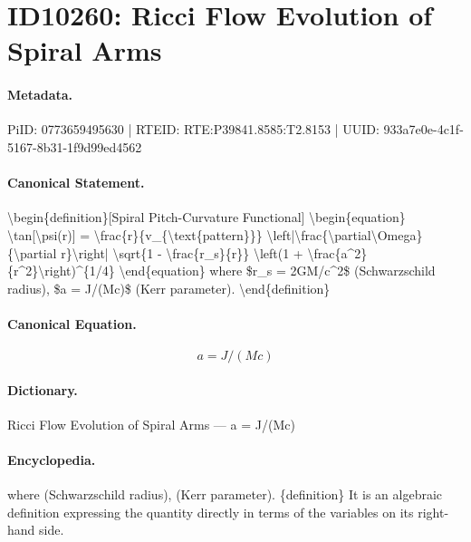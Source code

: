 \section*{ID10260: Ricci Flow Evolution of Spiral Arms}
\paragraph{Metadata.}
PiID: 0773659495630 | RTEID: RTE:P39841.8585:T2.8153 | UUID: 933a7e0e-4c1f-5167-8b31-1f9d99ed4562

\paragraph{Canonical Statement.}
\textbackslash{}begin\{definition\}[Spiral Pitch-Curvature Functional] \textbackslash{}begin\{equation\} \textbackslash{}tan[\textbackslash{}psi(r)] = \textbackslash{}frac\{r\}\{v\_\{\textbackslash{}text\{pattern\}\}\} \textbackslash{}left|\textbackslash{}frac\{\textbackslash{}partial\textbackslash{}Omega\}\{\textbackslash{}partial r\}\textbackslash{}right| \textbackslash{}sqrt\{1 - \textbackslash{}frac\{r\_s\}\{r\}\} \textbackslash{}left(1 + \textbackslash{}frac\{a\textasciicircum{}2\}\{r\textasciicircum{}2\}\textbackslash{}right)\textasciicircum{}\{1/4\} \textbackslash{}end\{equation\} where \$r\_s = 2GM/c\textasciicircum{}2\$ (Schwarzschild radius), \$a = J/(Mc)\$ (Kerr parameter). \textbackslash{}end\{definition\}

\paragraph{Canonical Equation.}
\[
a = J/(Mc)
\]

\paragraph{Dictionary.}
Ricci Flow Evolution of Spiral Arms — a = J/(Mc)

\paragraph{Encyclopedia.}
where (Schwarzschild radius), (Kerr parameter). \{definition\} It is an algebraic definition expressing the quantity directly in terms of the variables on its right-hand side.
